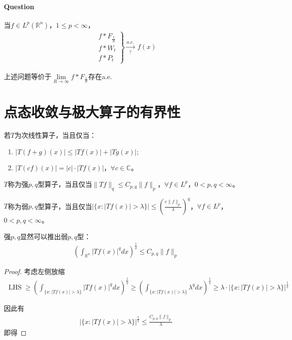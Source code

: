 \paragraph{Question} 当$f\in L^p(\mathbb{R}^n)$，$1\leqslant p< \infty$，
\begin{align*}
    \left.\begin{array}{c}
        f*F_{\frac{1}{R}} \\
        f*W_t \\
        f*P_t
    \end{array} \right\rbrace \xrightarrow[?]{a.e.} \ f(x)
\end{align*}

上述问题等价于$\lim\limits_{R\to\infty} f*F_{\frac{1}{R}}$存在a.e.

\section{点态收敛与极大算子的有界性}
\begin{definition}[次线性算子]
    若$T$为次线性算子，当且仅当：
    \begin{enumerate}[leftmargin=1cm, label=\arabic*.]
        \item $|T(f+g)(x)| \leqslant |Tf(x)| + |Tg(x)|$;
        \item $|T(cf)(x)| = |c|\cdot |Tf(x)|$，$\forall c\in \mathbb{C}$。
    \end{enumerate}
\end{definition}

\begin{definition}[强$p,q$型]
    $T$称为强$p,q$型算子，当且仅当$\|Tf\|_q \leqslant C_{p,q} \|f\|_p$，$\forall f\in L^p$，$0<p,q<\infty$。
\end{definition}

\begin{definition}[弱$p,q$型]
    $T$称为弱$p,q$型算子，当且仅当$|\{x: |Tf(x)| > \lambda\}| \leqslant \left( \frac{c\|f\|_p}{\lambda}\right)^q$，$\forall f\in L^p$，$0<p,q<\infty$。
\end{definition}

\begin{Corollary}
    强$p,q$显然可以推出弱$p,q$型：
    \begin{align*}
        \left(\int_{\mathbb{R}^n} |Tf(x)|^q dx \right)^{\frac{1}{q}} \leqslant C_{p,q} \|f\|_p
    \end{align*}
\end{Corollary}
\begin{proof}
    考虑左侧放缩
    \begin{align*}
        \operatorname{LHS} \geqslant \left(\int_{\{x: |Tf(x)| > \lambda\}}  |Tf(x)|^q dx \right)^{\frac{1}{q}} \geqslant \left(\int_{\{x: |Tf(x)| > \lambda\}}  \lambda^q dx \right)^{\frac{1}{q}}  \geqslant \lambda \cdot \left|\{x: |Tf(x)| > \lambda \}\right|^{\frac{1}{q}}
    \end{align*}

    因此有
    \begin{align*}
        \left|\{x: |Tf(x)| > \lambda \}\right|^{\frac{1}{q}} \leqslant \frac{C_{p,q}\|f\|_p}{\lambda}
    \end{align*}
    即得
\end{proof}
    
